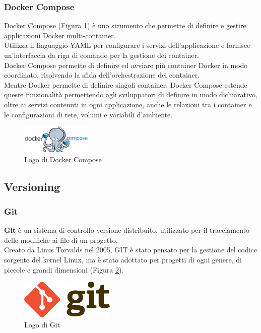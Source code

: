 \subsubsection{Docker Compose}
Docker Compose (Figura \ref{fig:docker_compose}) è uno strumento che permette di definire e gestire applicazioni \gls{Docker}{} multi-container. \\
Utilizza il linguaggio YAML per configurare i servizi dell'applicazione e fornisce un'interfaccia da riga di comando per la gestione dei \gls{container}{}.\\
Docker Compose permette di definire ed avviare più \gls{container}{} \gls{Docker}{} in modo coordinato, risolvendo 
la sfida dell'orchestrazione dei \gls{container}{}.\\
Mentre \gls{Docker}{} permette di definire singoli \gls{container}{}, Docker Compose estende queste funzionalità permettendo agli sviluppatori 
di definire in modo dichiarativo, oltre ai servizi contenuti in ogni applicazione, anche le relazioni tra i \gls{container}{} e le configurazioni di rete, volumi e variabili d'ambiente.\\
\begin{figure}[h]
    \centering
    \includegraphics[width=0.3\textwidth]{images/tecnologie/logo_docker_compose.png}
    \caption{Logo di Docker Compose}
    \label{fig:docker_compose}
\end{figure}
\pagebreak
\subsection{Versioning}
\subsubsection{Git}
\textbf{Git} è un sistema di controllo versione distribuito, utilizzato per il tracciamento delle modifiche ai file di un progetto.\\ 
Creato da Linus Torvalds nel 2005, GIT è stato pensato per la gestione del codice sorgente del kernel Linux, ma è stato adottato 
per progetti di ogni genere, di piccole e grandi dimensioni (Figura \ref{fig:git}).\\
\begin{figure}[h]
    \centering
    \includegraphics[width=0.4\textwidth]{images/tecnologie/logo_git.png}
    \caption{Logo di Git}
    \label{fig:git}
\end{figure}


